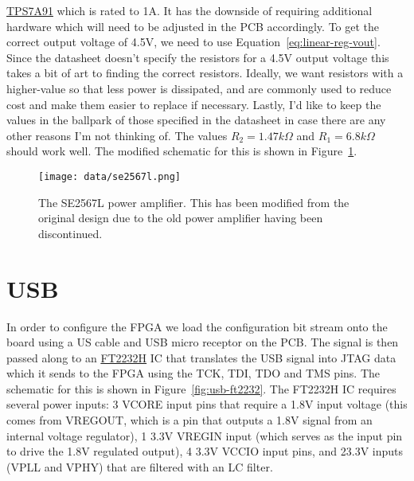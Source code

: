 \documentclass{default}
\begin{document}
\href{http://www.ti.com/lit/ds/symlink/tps7a91.pdf}{TPS7A91} which is rated to 1A. It has the
downside of requiring additional hardware which will need to be adjusted in the PCB accordingly. To
get the correct output voltage of 4.5V, we need to use Equation~\ref{eq:linear-reg-vout}. Since the
datasheet doesn't specify the resistors for a 4.5V output voltage this takes a bit of art to finding
the correct resistors. Ideally, we want resistors with a higher-value so that less power is
dissipated, and are commonly used to reduce cost and make them easier to replace if
necessary. Lastly, I'd like to keep the values in the ballpark of those specified in the datasheet
in case there are any other reasons I'm not thinking of. The values $R_2 = 1.47\si{k\Omega}$ and
$R_1 = 6.8\si{k\Omega}$ should work well. The modified schematic for this is shown in
Figure~\ref{fig:se2567l}.

\begin{figure}[h]
  \centering
  \texttt{[image: data/se2567l.png]}
  \caption{The SE2567L power amplifier. This has been modified from the original design due to the
    old power amplifier having been discontinued.}
  \label{fig:se2567l}
\end{figure}

\section{USB}

In order to configure the FPGA we load the configuration bit stream onto the board using a US cable
and USB micro receptor on the PCB. The signal is then passed along to
an \href{http://www.ftdichip.com/Support/Documents/DataSheets/ICs/DS_FT2232H.pdf}{FT2232H} IC
that translates the USB signal into JTAG data which it sends to the FPGA using the TCK, TDI, TDO and
TMS pins. The schematic for this is shown in Figure~\ref{fig:usb-ft2232}. The FT2232H IC
requires several power inputs: 3 VCORE input pins that require a 1.8V input voltage (this comes from
VREGOUT, which is a pin that outputs a 1.8V signal from an internal voltage regulator), 1 3.3V VREGIN
input (which serves as the input pin to drive the 1.8V regulated output), 4 3.3V VCCIO input pins,
and 23.3V inputs (VPLL and VPHY) that are filtered with an LC filter.
\end{document}
